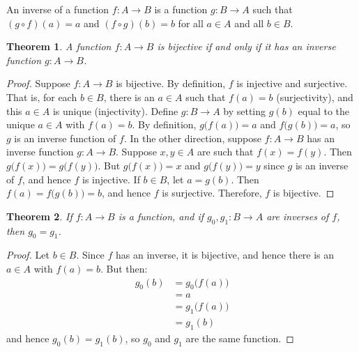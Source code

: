 \documentclass{article}
\theoremstyle{plain}
\newtheorem{theorem}{Theorem}[section]
\theoremstyle{normal}
\newenvironment{definition}{%
    \pushQED{\qed}\renewcommand{\qedsymbol}{$\blacksquare$}\definitionx%
}{%
    \popQED\enddefinitionx%
}
\begin{document}
        \begin{definition}[\textbf{Inverse Function}]
            An inverse of a function $f:A\rightarrow{B}$ is a function
            $g:B\rightarrow{A}$ such that $(g\circ{f})(a)=a$ and
            $(f\circ{g})(b)=b$ for all $a\in{A}$ and all $b\in{B}$.
        \end{definition}
        \begin{theorem}
            A function $f:A\rightarrow{B}$ is bijective if and only if it has
            an inverse function $g:A\rightarrow{B}$.
        \end{theorem}
        \begin{proof}
            Suppose $f:A\rightarrow{B}$ is bijective. By definition, $f$ is
            injective and surjective. That is, for each $b\in{B}$, there is
            an $a\in{A}$ such that $f(a)=b$ (surjectivity), and
            this $a\in{A}$ is unique (injectivity). Define $g:B\rightarrow{A}$
            by setting $g(b)$ equal to the unique $a\in{A}$ with
            $f(a)=b$. By definition, $g\big(f(a)\big)=a$ and
            $f\big(g(b)\big)=a$, so $g$ is an inverse function of $f$. In the
            other direction, suppose $f:A\rightarrow{B}$ has an inverse
            function $g:A\rightarrow{B}$. Suppose $x,y\in{A}$ are such
            that $f(x)=f(y)$. Then $g\big(f(x)\big)=g\big(f(y)\big)$.
            But $g\big(f(x)\big)=x$ and $g\big(f(y)\big)=y$ since $g$ is an
            inverse of $f$, and hence $f$ is injective. If $b\in{B}$, let
            $a=g(b)$. Then $f(a)=f\big(g(b)\big)=b$, and hence $f$ is
            surjective. Therefore, $f$ is bijective.
        \end{proof}
        \begin{theorem}
            If $f:A\rightarrow{B}$ is a function, and if
            $g_{0},g_{1}:B\rightarrow{A}$ are inverses of $f$, then
            $g_{0}=g_{1}$.
        \end{theorem}
        \begin{proof}
            Let $b\in{B}$. Since $f$ has an inverse, it is bijective,
            and hence there is an $a\in{A}$ with $f(a)=b$. But then:
            \begin{align}
                g_{0}(b)&=g_{0}\big(f(a)\big)\\
                    &=a\\
                    &=g_{1}\big(f(a)\big)\\
                    &=g_{1}(b)
            \end{align}
            and hence $g_{0}(b)=g_{1}(b)$, so $g_{0}$ and $g_{1}$ are the
            same function.
        \end{proof}
\end{document}
